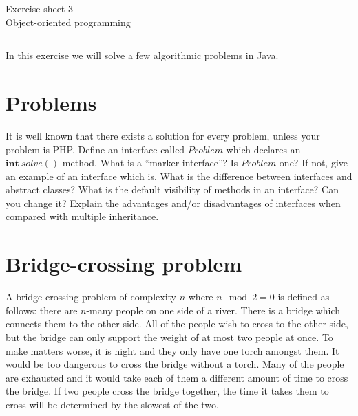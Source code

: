 \documentclass[10pt,a4paper,fleqn]{exam}
\begin{document}
\begin{center}
\Large Exercise sheet 3 \\
\LARGE Object-oriented programming 
\end{center}

\hrule

\vspace{0.5cm}

In this exercise we will solve a few algorithmic problems in Java.

\begin{questions}

\section{Problems}

\question It is well known that there exists a solution for every problem, unless your problem is PHP. Define an interface called $\mathit{Problem}$ which declares an $\mathbf{int}~\mathit{solve}()$ method.
\question What is a ``marker interface''? Is $\mathit{Problem}$ one? If not, give an example of an interface which is.
\question What is the difference between interfaces and abstract classes?
\question What is the default visibility of methods in an interface? Can you change it?
\question Explain the advantages and/or disadvantages of interfaces when compared with multiple inheritance.

\section{Bridge-crossing problem}

\question A bridge-crossing problem of complexity $n$ where $n \mod 2 = 0$ is defined as follows: there are $n$-many people on one side of a river. There is a bridge which connects them to the other side. All of the people wish to cross to the other side, but the bridge can only support the weight of at most two people at once. To make matters worse, it is night and they only have one torch amongst them. It would be too dangerous to cross the bridge without a torch. Many of the people are exhausted and it would take each of them a different amount of time to cross the bridge. If two people cross the bridge together, the time it takes them to cross will be determined by the slowest of the two.


\end{questions}
\end{document}
